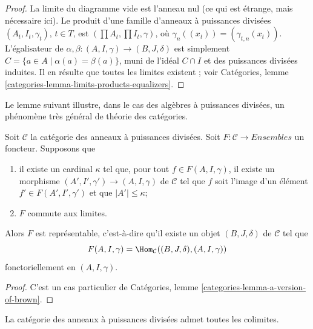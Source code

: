 \begin{proof}
La limite du diagramme vide est l'anneau nul (ce qui est étrange, mais nécessaire
ici). Le produit d'une famille d'anneaux à puissances divisées $(A_t, I_t, \gamma_t)$,
$t \in T$, est $(\prod A_t, \prod I_t, \gamma)$, où
$\gamma_n((x_t)) = (\gamma_{t, n}(x_t))$.
L'égalisateur de $\alpha, \beta : (A, I, \gamma) \to (B, J, \delta)$
est simplement $C = \{a \in A \mid\alpha(a) = \beta(a)\}$, muni de l'idéal $C \cap I$
et des puissances divisées induites. Il en résulte que toutes les limites existent ;
voir Catégories, lemme \ref{categories-lemma-limits-products-equalizers}.
\end{proof}

\noindent
Le lemme suivant illustre, dans le cas des algèbres à puissances
divisées, un phénomène très général de théorie des catégories.

\begin{lemma}
\label{lemma-a-version-of-brown}
Soit $\mathcal{C}$ la catégorie des anneaux à puissances divisées. Soit
$F : \mathcal{C} \to\textit{Ensembles}$ un foncteur.
Supposons que
\begin{enumerate}
\item il existe un cardinal $\kappa$ tel que, pour tout
$f \in F(A, I, \gamma)$, il existe un morphisme
$(A', I', \gamma') \to (A, I, \gamma)$ de $\mathcal{C}$ tel que $f$
soit l'image d'un élément $f' \in F(A', I', \gamma')$ et que $|A'| \leq\kappa$;
\item $F$ commute aux limites.
\end{enumerate}
Alors $F$ est représentable, c'est-à-dire qu'il existe un objet $(B, J, \delta)$
de $\mathcal{C}$ tel que
$$
F(A, I, \gamma) = \Hom_\mathcal{C}((B, J, \delta), (A, I, \gamma))
$$
fonctoriellement en $(A, I, \gamma)$.
\end{lemma}

\begin{proof}
C'est un cas particulier de
Catégories, lemme \ref{categories-lemma-a-version-of-brown}.
\end{proof}

\begin{lemma}
\label{lemma-colimits} La
catégorie des anneaux à puissances divisées admet toutes les colimites.
\end{lemma}

